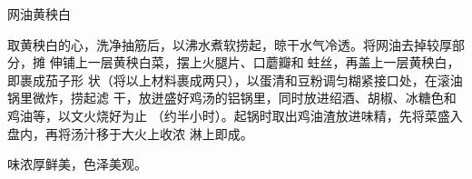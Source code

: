 \begin{recipe}{网油黄秧白}

\ingredients


\preparation

取黄秧白的心，洗净抽筋后，以沸水煮软捞起，晾干水气冷透。将网油去掉较厚部分，摊
伸铺上一层黄秧白菜，摆上火腿片、口蘑瓣和𧎼蛀丝，再盖上一层黄秧白，即裹成茄子形
状（将以上材料裹成两只），以蛋清和豆粉调匀糊紧接口处，在滚油锅里微炸，捞起滤
干，放迸盛好鸡汤的铝锅里，同时放进绍酒、胡椒、冰糖色和鸡油等，以文火烧好为止
（约半小时）。起锅时取出鸡油渣放进味精，先将菜盛入盘内，再将汤汁移于大火上收浓
淋上即成。

\features

味浓厚鲜美，色泽美观。

\end{recipe}

